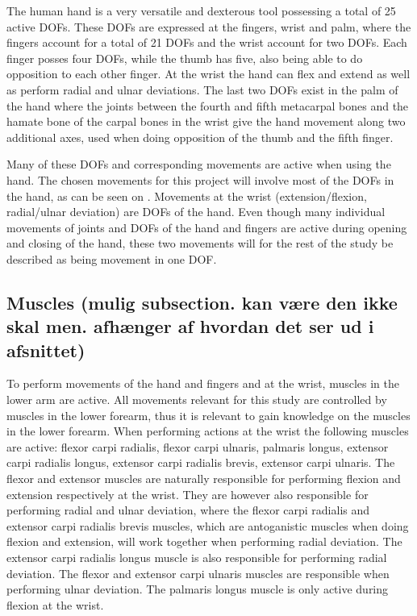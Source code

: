 The human hand is a very versatile and dexterous tool possessing a total of 25 active DOFs. These DOFs are expressed at the fingers, wrist and palm, where the fingers account for a total of 21 DOFs and the wrist account for two DOFs. Each finger posses four DOFs, while the thumb has five, also being able to do opposition to each other finger. At the wrist the hand can flex and extend as well as perform radial and ulnar deviations. The last two DOFs exist in the palm of the hand where the joints between the fourth and fifth metacarpal bones and the hamate bone of the carpal bones in the wrist give the hand movement along two additional axes, used when doing opposition of the thumb and the fifth finger. \cite{Martini2012}

Many of these DOFs and corresponding movements are active when using the hand. The chosen movements for this project will involve most of the DOFs in the hand, as can be seen on . Movements at the wrist (extension/flexion, radial/ulnar deviation) are DOFs of the hand. Even though many individual movements of joints and DOFs of the hand and fingers are active during opening and closing of the hand, these two movements will for the rest of the study be described as being movement in one DOF. 

\subsection{Muscles (mulig subsection. kan være den ikke skal men. afhænger af hvordan det ser ud i afsnittet)}

To perform movements of the hand and fingers and at the wrist, muscles in the lower arm are active. All movements relevant for this study are controlled by muscles in the lower forearm, thus it is relevant to gain knowledge on the muscles in the lower forearm. When performing actions at the wrist the following muscles are active: flexor carpi radialis, flexor carpi ulnaris, palmaris longus, extensor carpi radialis longus, extensor carpi radialis brevis, extensor carpi ulnaris. The flexor and extensor muscles are naturally responsible for performing flexion and extension respectively at the wrist. They are however also responsible for performing radial and ulnar deviation, where the flexor carpi radialis and extensor carpi radialis brevis muscles, which are antoganistic muscles when doing flexion and extension, will work together when performing radial deviation. The extensor carpi radialis longus muscle is also responsible for performing radial deviation. The flexor and extensor carpi ulnaris muscles are responsible when performing ulnar deviation. The palmaris longus muscle is only active during flexion at the wrist. \cite{Martini2012}

